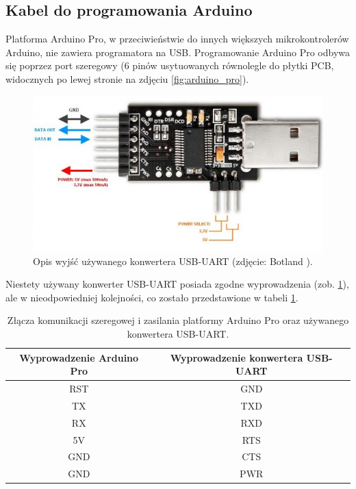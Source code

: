 \subsection{Kabel do programowania Arduino}
\label{subsec:kabel_do_programowania_arduino}

Platforma Arduino Pro, w przeciwieństwie do innych większych mikrokontrolerów Arduino, nie zawiera programatora na USB. Programowanie Arduino Pro odbywa się poprzez port szeregowy (6 pinów usytuowanych równolegle do płytki PCB, widocznych po lewej stronie na zdjęciu \ref{fig:arduino_pro}).

\begin{figure}[h]
	\centering
	\includegraphics[scale=0.5]{pics/konwerter-usb-uart-ft232-33-5v.jpg}
	\caption{\label{fig:konwerter}Opis wyjść używanego konwertera USB-UART (zdjęcie: Botland \cite{KonwerterBotland}).}
\end{figure}

Niestety używany konwerter USB-UART posiada zgodne wyprowadzenia (zob. \ref{fig:konwerter}), ale w nieodpowiedniej kolejności, co zostało przedstawione w tabeli \ref{tab:piny}.

\begin{table}[h]
    \centering
    
    \begin{threeparttable}
        \caption{Złącza komunikacji szeregowej i zasilania platformy Arduino Pro oraz używanego konwertera USB-UART.}
        \label{tab:piny}
        
        \begin{tabular}{cc}
            \toprule
            Wyprowadzenie Arduino Pro & Wyprowadzenie konwertera USB-UART \\
            \midrule
            RST & GND \\
            TX & TXD \\
            RX & RXD \\
            5V & RTS \\
            GND & CTS \\
            GND & PWR \\
            \bottomrule
        \end{tabular}
        
    \end{threeparttable}
\end{table}

